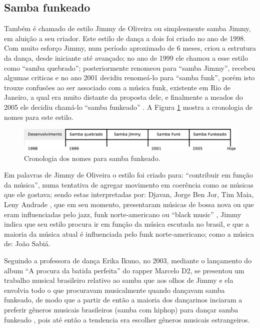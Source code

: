 \subsection{Samba funkeado}
\label{subsec:sambafunkeado}
Também é chamado de estilo Jimmy de Oliveira ou simplesmente  samba Jimmy, 
em aluição a seu criador.
Este estilo de dança a dois foi criado no ano de 1998.
Com muito esforço Jimmy, num período aproximado de 6 meses, 
criou a estrutura da dança, desde iniciante até avançado;
no ano de 1999 ele  chamou a esse estilo como ``samba quebrado'';  
posteriormente renomeou  para ``samba Jimmy'', 
recebeu algumas criticas e no ano 2001 decidiu renomeá-lo para ``samba funk'',
porém isto trouxe confusões   ao ser associado com a música funk, existente em Rio de Janeiro,
a qual era muito distante da proposta dele, e
finalmente a meados do 2005 ele decidiu chamá-lo ``samba funkeado''  \cite{sambafunkeadoJimmyDeOliveiraPart1}.
A Figura \ref{fig:funkeadocrono1} mostra a cronologia de nomes para este estilo.
\begin{figure}[h]
  \centering
    \includegraphics[width=1.0\textwidth]{chapters/cap-historia-dancasamba/sambafunkeado.eps}
  \caption{Cronologia dos nomes para samba funkeado.}
\label{fig:funkeadocrono1}
\end{figure}

Em palavras de Jimmy de Oliveira o estilo foi criado para: ``contribuir em função da música'', 
numa tentativa de agregar movimento em coerência como as músicas que ele gostava;
sendo estas interpretadas por:
Djavan, Jorge Ben Jor, Tim Maia, Leny Andrade \cite{sambafunkeadoJimmyDeOliveiraPart1}, que em seu momento, 
presentaram músicas de bossa nova ou que eram influenciadas pelo jazz, 
funk norte-americano ou ``black music'' \cite{sambafunkeadoJimmyDeOliveiraPart1} \cite{sambafunkeadoJimmyDeOliveiraPart3},
Jimmy indica que seu estilo procura ir em função da música escutada no brasil, 
e que a maioria da música atual é influenciada pelo funk norte-americano;
como a música de: João Sabiá. 

 
Seguindo a professora de dança Erika Ikuno, no 2003, 
mediante o lançamento do album ``A procura da batida perfeita'' do rapper Marcelo D2,
se presentou um trabalho musical brasileiro relativo ao samba que aos olhos de Jimmy e ela
envolvia todo o que procuravam musicalmente quando dançavam samba funkeado,
de modo que a partir de então a maioria dos dançarinos inciaram a preferir gêneros 
musicais brasileiros (samba com hiphop) para dançar samba funkeado \cite[pp. 92]{filho2016tango},
pois até então a tendencia era escolher gêneros musicais estrangeiros.

